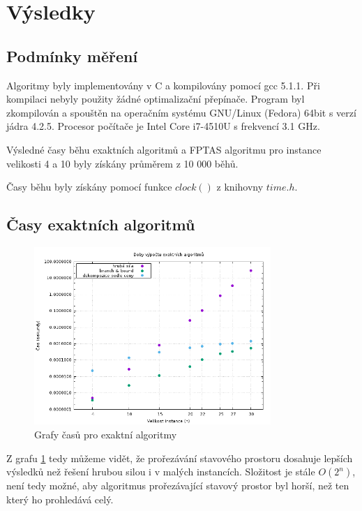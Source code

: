 \documentclass[11pt]{article}
\begin{document}
\section{Výsledky}

\subsection{Podmínky měření}

Algoritmy byly implementovány v C a kompilovány pomocí gcc 5.1.1. Při kompilaci nebyly použity žádné optimalizační přepínače. Program byl zkompilován a spouštěn na operačním systému GNU/Linux (Fedora) 64bit s verzí jádra 4.2.5. Procesor počítače je Intel Core i7-4510U s frekvencí 3.1 GHz.

Výsledné časy běhu exaktních algoritmů a FPTAS algoritmu pro instance velikosti 4 a 10 byly získány průměrem z 10 000 běhů. 

Časy běhu byly získány pomocí funkce $clock()$ z knihovny $time.h$.

\subsection{Časy exaktních algoritmů}

\begin{figure}[h!]
	\centering
    	\includegraphics[width=0.8\textwidth]{exact_times.png}
    	\caption{Grafy časů pro exaktní algoritmy}
	\label{fig:exact_times}
\end{figure}

Z grafu \ref{fig:exact_times} tedy můžeme vidět, že prořezávání stavového prostoru dosahuje lepších výsledků než řešení hrubou silou i v malých instancích. Složitost je stále $O(2^n)$, není tedy možné, aby algoritmus prořezávající stavový prostor byl horší, než ten který ho prohledává celý. 
\end{document}
